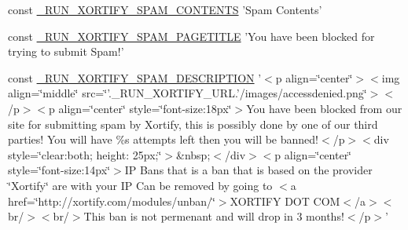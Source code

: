 \begin{DoxyCompactItemize}
\item 
const \hyperlink{constants_8php_aaa5ef22232e5b7391ffb884c2465cbf2}{\-\_\-\-R\-U\-N\-\_\-\-X\-O\-R\-T\-I\-F\-Y\-\_\-\-S\-P\-A\-M\-\_\-\-C\-O\-N\-T\-E\-N\-T\-S} 'Spam Contents'
\item 
const \hyperlink{constants_8php_aac15bb1f0d2c1c197625f079781d7a3f}{\-\_\-\-R\-U\-N\-\_\-\-X\-O\-R\-T\-I\-F\-Y\-\_\-\-S\-P\-A\-M\-\_\-\-P\-A\-G\-E\-T\-I\-T\-L\-E} 'You have been blocked for trying to submit Spam!'
\item 
const \hyperlink{constants_8php_ade85f11916906db345935caa6bfc5e70}{\-\_\-\-R\-U\-N\-\_\-\-X\-O\-R\-T\-I\-F\-Y\-\_\-\-S\-P\-A\-M\-\_\-\-D\-E\-S\-C\-R\-I\-P\-T\-I\-O\-N} '$<$p align=\char`\"{}center\char`\"{}$>$$<$img align=\char`\"{}middle\char`\"{} src=\char`\"{}'.\-\_\-\-R\-U\-N\-\_\-\-X\-O\-R\-T\-I\-F\-Y\-\_\-\-U\-R\-L.'/images/accessdenied.\-png\char`\"{}$>$$<$/p$>$$<$p align=\char`\"{}center\char`\"{} style=\char`\"{}font-\/size\-:18px\char`\"{}$>$You have been blocked from our site for submitting spam by Xortify, this is possibly done by one of our third parties! You will have \%s attempts left then you will be banned!$<$/p$>$$<$div style=\char`\"{}clear\-:both; height\-: 25px;\char`\"{}$>$\&nbsp;$<$/div$>$$<$p align=\char`\"{}center\char`\"{} style=\char`\"{}font-\/size\-:14px\char`\"{}$>$\-I\-P Bans that is a ban that is based on the provider \char`\"{}\-Xortify\char`\"{} are with your I\-P Can be removed by going to $<$a href=\char`\"{}http\-://xortify.\-com/modules/unban/\char`\"{}$>$\-X\-O\-R\-T\-I\-F\-Y D\-O\-T C\-O\-M$<$/a$>$$<$br/$>$$<$br/$>$\-This ban is not permenant and will drop in 3 months!$<$/p$>$'
\end{DoxyCompactItemize}


